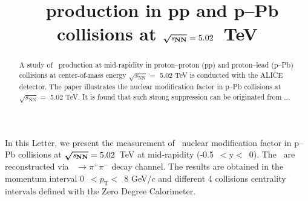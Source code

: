 \documentclass[ALICE,manyauthors]{cernphprep}
\begin{document}
\begin{titlepage}

\PHyear{}
\PHdate{\today}
%

\title{\fzero\ production in pp and p--Pb collisions at $\boldsymbol{\sqrt{{\textit s_\mathrm{NN}}}}=5.02$~TeV}
\ShortTitle{}   %


\begin{abstract}
A study of \fzero~production at mid-rapidity in proton--proton (pp) and proton--lead (p--Pb) collisions at center-of-mass energy $\sqrt{s_{\mathrm{NN}}} = $ 5.02 TeV is conducted with the ALICE detector. The paper illustrates the nuclear modification factor in p--Pb collisions at $\sqrt{s_{\mathrm{NN}}}=$ 5.02 TeV. It is found that such strong suppression can be originated from ...
\end{abstract}

\end{titlepage}

\setcounter{page}{2}

%
%
%
%

In this Letter, we present the measurement of \fzero~nuclear modification factor in p--Pb collisions at $\boldsymbol{\sqrt{{\textit s_{\mathrm{NN}}}}}=5.02$~TeV at mid-rapidity (-0.5~$<\mathrm{y}<$~0). The \fzero~are reconstructed via \fzero~$\rightarrow \pi^{+}\pi^{-}$ decay channel. The results are obtained in the momentum interval 0~$<p_{\mathrm{T}}<$~8 GeV/$c$ and different 4 collisions centrality intervals defined with the Zero Degree Calorimeter. 
\end{document}
